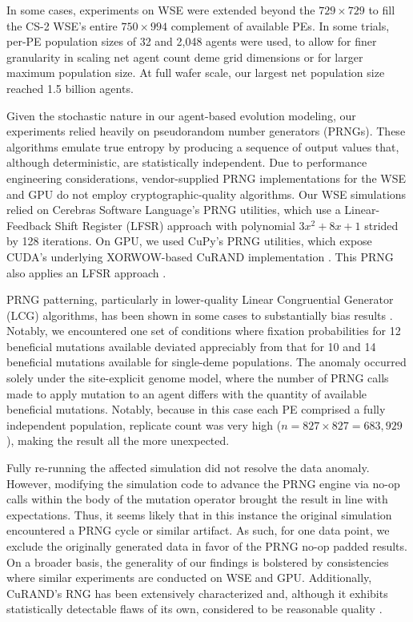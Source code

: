 In some cases, experiments on WSE were extended beyond the $729 \times 729$ to fill the CS-2 WSE's entire $750 \times 994$ complement of available PEs.
In some trials, per-PE population sizes of 32 and 2,048 agents were used, to allow for finer granularity in scaling net agent count deme grid dimensions or for larger maximum population size.
At full wafer scale, our largest net population size reached 1.5 billion agents.

Given the stochastic nature in our agent-based evolution modeling, our experiments relied heavily on pseudorandom number generators (PRNGs).
These algorithms emulate true entropy by producing a sequence of output values that, although deterministic, are statistically independent.
Due to performance engineering considerations, vendor-supplied PRNG implementations for the WSE and GPU do not employ cryptographic-quality algorithms.
Our WSE simulations relied on Cerebras Software Language's PRNG utilities, which use a Linear-Feedback Shift Register (LFSR) approach with polynomial $3x^2 + 8x + 1$ strided by 128 iterations.
On GPU, we used CuPy's PRNG utilities, which expose CUDA's underlying XORWOW-based CuRAND implementation \citep{marsaglia2003xorshift}.
This PRNG also applies an LFSR approach \citep{brent2004note}.

PRNG patterning, particularly in lower-quality Linear Congruential Generator (LCG) algorithms, has been shown in some cases to substantially bias results \citep{click2010quality}.
Notably, we encountered one set of conditions where fixation probabilities for 12 beneficial mutations available deviated appreciably from that for 10 and 14 beneficial mutations available for single-deme populations.
The anomaly occurred solely under the site-explicit genome model, where the number of PRNG calls made to apply mutation to an agent differs with the quantity of available beneficial mutations.
Notably, because in this case each PE comprised a fully independent population, replicate count was very high ($n = 827 \times 827 = 683,929$), making the result all the more unexpected.

Fully re-running the affected simulation did not resolve the data anomaly.
However, modifying the simulation code to advance the PRNG engine via no-op calls within the body of the mutation operator brought the result in line with expectations.
Thus, it seems likely that in this instance the original simulation encountered a PRNG cycle or similar artifact.
As such, for one data point, we exclude the originally generated data in favor of the  PRNG no-op padded results.
On a broader basis, the generality of our findings is bolstered by consistencies where similar experiments are conducted on WSE and GPU.
Additionally, CuRAND's RNG has been extensively characterized and, although it exhibits statistically detectable flaws of its own, considered to be reasonable quality \citep{nvidia2024curand}.

